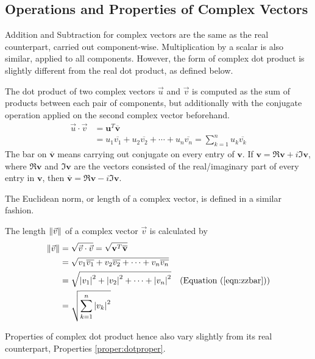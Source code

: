 \subsection{Operations and Properties of Complex Vectors}
Addition and Subtraction for complex vectors are the same as the real counterpart, carried out component-wise. Multiplication by a scalar is also similar, applied to all components. However, the form of complex dot product is slightly different from the real dot product, as defined below.
\begin{defn}
\label{defn:complexdotproduct}
The dot product of two complex vectors $\vec{u}$ and $\vec{v}$ is computed as the sum of products between each pair of components, but additionally with the conjugate operation applied on the second complex vector beforehand.
\begin{align}
\vec{u} \cdot \vec{v} &= \textbf{u}^T \overline{\textbf{v}} \nonumber \\
&= u_1\overline{v_1} + u_2\overline{v_2} + \cdots + u_n\overline{v_n} = \sum_{k=1}^{n} u_k\overline{v_k}
\end{align}
The bar on $\overline{\textbf{v}}$ means carrying out conjugate on every entry of $\textbf{v}$. If $\textbf{v} = \Re{\textbf{v}} + i\Im{\textbf{v}}$, where $\Re{\textbf{v}}$ and $\Im{\textbf{v}}$ are the vectors consisted of the real/imaginary part of every entry in $\textbf{v}$, then $\overline{\textbf{v}} = \Re{\textbf{v}} - i\Im{\textbf{v}}$.
\end{defn}
The Euclidean norm, or length of a complex vector, is defined in a similar fashion.
\begin{defn}
The length $\norm{\vec{v}}$ of a complex vector $\vec{v}$ is calculated by
\begin{align}
\norm{\vec{v}} &= \sqrt{\vec{v} \cdot \vec{v}} = \sqrt{\textbf{v}^T \overline{\textbf{v}}} \nonumber \\
&= \sqrt{v_1\overline{v_1} + v_2\overline{v_2} + \cdots + v_n\overline{v_n}} \nonumber\\
&= \sqrt{\abs{v_1}^2 + \abs{v_2}^2 + \cdots + \abs{v_n}^2} & \text{(Equation (\ref{eqn:zzbar}))} \nonumber \\
&= \sqrt{\sum_{k=1}^{n} \abs{v_k}^2}
\end{align}
\end{defn}
Properties of complex dot product hence also vary slightly from its real counterpart, Properties \ref{proper:dotproper}.
